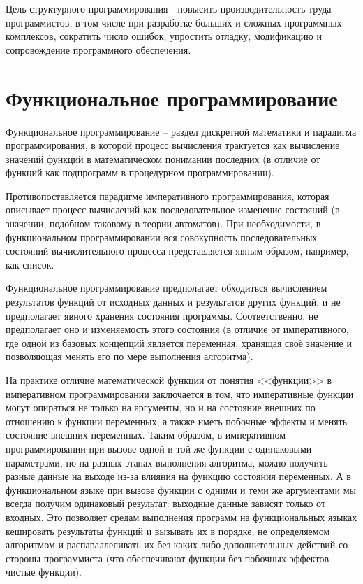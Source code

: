 \documentclass[12pt, twoside]{report}
\begin{document}
Цель структурного программирования - повысить производительность труда программистов, в том числе при разработке больших и сложных программных комплексов, сократить число ошибок, упростить отладку, модификацию и сопровождение программного обеспечения.

\section*{Функциональное программирование}

Функциональное программирование -- раздел дискретной математики и парадигма программирования, в которой процесс вычисления трактуется как вычисление значений функций в математическом понимании последних (в отличие от функций как подпрограмм в процедурном программировании).

Противопоставляется парадигме императивного программирования, которая описывает процесс вычислений как последовательное изменение состояний (в значении, подобном таковому в теории автоматов). При необходимости, в функциональном программировании вся совокупность последовательных состояний вычислительного процесса представляется явным образом, например, как список.

Функциональное программирование предполагает обходиться вычислением результатов функций от исходных данных и результатов других функций, и не предполагает явного хранения состояния программы. Соответственно, не предполагает оно и изменяемость этого состояния (в отличие от императивного, где одной из базовых концепций является переменная, хранящая своё значение и позволяющая менять его по мере выполнения алгоритма).

На практике отличие математической функции от понятия <<функции>> в императивном программировании заключается в том, что императивные функции могут опираться не только на аргументы, но и на состояние внешних по отношению к функции переменных, а также иметь побочные эффекты и менять состояние внешних переменных. Таким образом, в императивном программировании при вызове одной и той же функции с одинаковыми параметрами, но на разных этапах выполнения алгоритма, можно получить разные данные на выходе из-за влияния на функцию состояния переменных. А в функциональном языке при вызове функции с одними и теми же аргументами мы всегда получим одинаковый результат: выходные данные зависят только от входных. Это позволяет средам выполнения программ на функциональных языках кешировать результаты функций и вызывать их в порядке, не определяемом алгоритмом и распараллеливать их без каких-либо дополнительных действий со стороны программиста (что обеспечивают функции без побочных эффектов - чистые функции).
\end{document}
